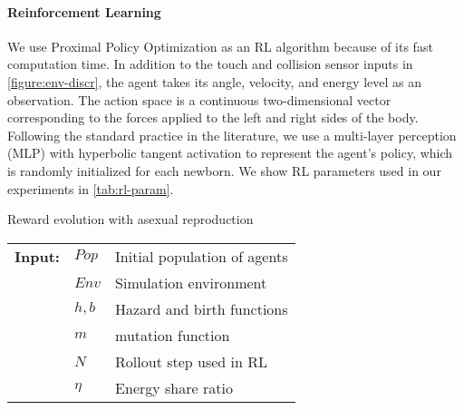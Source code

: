\paragraph{Reinforcement Learning}
We use Proximal Policy Optimization \citep{schulmanProximalPolicyOptimization2017} as an RL algorithm because of its fast computation time. In addition to the touch and collision sensor inputs in \cref{figure:env-discr}, the agent takes its angle, velocity, and energy level as an observation. The action space is a continuous two-dimensional vector corresponding to the forces applied to the left and right sides of the body. Following the standard practice in the literature, we use a multi-layer perception (MLP) with hyperbolic tangent activation to represent the agent's policy, which is randomly initialized for each newborn. We show RL parameters used in our experiments in \cref{tab:rl-param}.

\begin{algorithm}[t]
  \caption{Reward evolution with asexual reproduction}\label{alg:reward-evo}
  \begin{tabular}{lll}
    \textbf{Input:} & $Pop$ & Initial population of agents \\
                    & $Env$ & Simulation environment \\
                    & $h, b$ & Hazard and birth functions \\
                    & $m$ & mutation function \\
                    & $N$ & Rollout step used in RL \\
                    & $\eta$ & Energy share ratio
  \end{tabular}
  \begin{algorithmic}[1]
    \Loop{}
      \EndOnce{}
    \EndFor{}
       
      \EndWith{}
       
      \EndWith{}
    \EndFor{}
  \EndLoop{}
\end{algorithmic}
\end{algorithm}

